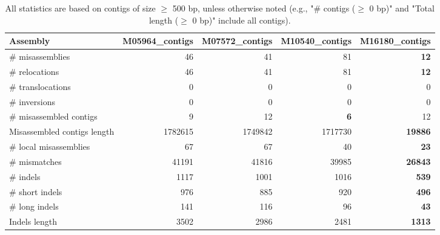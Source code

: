 \documentclass[12pt,a4paper]{article}
\begin{document}
\begin{table}[ht]
\begin{center}
\caption{All statistics are based on contigs of size $\geq$ 500 bp, unless otherwise noted (e.g., "\# contigs ($\geq$ 0 bp)" and "Total length ($\geq$ 0 bp)" include all contigs).}
\begin{tabular}{|l*{4}{|r}|}
\hline
Assembly & M05964\_contigs & M07572\_contigs & M10540\_contigs & M16180\_contigs \\ \hline
\# misassemblies & 46 & 41 & 81 & {\bf 12} \\ \hline
\hspace{5mm}\# relocations & 46 & 41 & 81 & {\bf 12} \\ \hline
\hspace{5mm}\# translocations & 0 & 0 & 0 & 0 \\ \hline
\hspace{5mm}\# inversions & 0 & 0 & 0 & 0 \\ \hline
\# misassembled contigs & 9 & 12 & {\bf 6} & 12 \\ \hline
Misassembled contigs length & 1782615 & 1749842 & 1717730 & {\bf 19886} \\ \hline
\# local misassemblies & 67 & 67 & 40 & {\bf 23} \\ \hline
\# mismatches & 41191 & 41816 & 39985 & {\bf 26843} \\ \hline
\# indels & 1117 & 1001 & 1016 & {\bf 539} \\ \hline
\hspace{5mm}\# short indels & 976 & 885 & 920 & {\bf 496} \\ \hline
\hspace{5mm}\# long indels & 141 & 116 & 96 & {\bf 43} \\ \hline
Indels length & 3502 & 2986 & 2481 & {\bf 1313} \\ \hline
\end{tabular}
\end{center}
\end{table}
\end{document}
